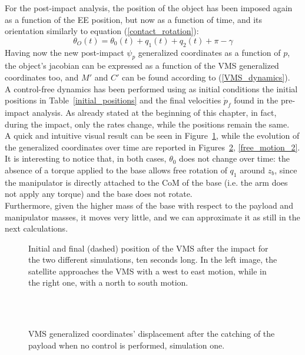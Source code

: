 \documentclass[a4paper,12pt,oneside]{report}
\begin{document}
For the post-impact analysis, the position of the object has been imposed again as a function of the EE position, but now as a function of time, and its orientation similarly to equation (\ref{contact_rotation}):
\begin{equation}
  \theta_O(t)=\theta_0(t)+q_1(t)+q_2(t)+\pi-\gamma
\end{equation}
Having now the new post-impact $\psi_p$ generalized coordinates as a function of $p$, the object's jacobian can be expressed as a function of the VMS generalized coordinates too, and $M'$ and $C'$ can be found according to (\ref{VMS_dynamics}).\\
A control-free dynamics has been performed using as initial conditions the initial positions in Table~\ref{initial_positions} and the final velocities $\dot{p}_f$ found in the pre-impact analysis. As already stated at the beginning of this chapter, in fact, during the impact, only the rates change, while the positions remain the same.\\
A quick and intuitive visual result can be seen in Figure~\ref{no_control_result}, while the evolution of the generalized coordinates over time are reported in Figures~\ref{free_motion_1}, \ref{free_motion_2}.\\
It is interesting to notice that, in both cases, $\theta_0$ does not change over time: the absence of a torque applied to the base allows free rotation of $q_1$ around $z_b$, since the manipulator is directly attached to the CoM of the base (i.e. the arm does not apply any torque) and the base does not rotate.\\
Furthermore, given the higher mass of the base with respect to the payload and manipulator masses, it moves very little, and we can approximate it as still in the next calculations.\\
\begin{figure}[!htb]
  \centering
  \caption{Initial and final (dashed) position of the VMS after the impact for the two different simulations, ten seconds long. In the left image, the satellite approaches the VMS with a west to east motion, while in the right one, with a north to south motion.}
  \label{no_control_result}
\end{figure}
\begin{figure}[!htb]
  \centering
  \subfloat
  {} \quad
\subfloat
  {} \\
  \subfloat
  {} \quad
  \subfloat
  {}\\
  \subfloat
  {}
  \caption{VMS generalized coordinates' displacement after the catching of the payload when no control is performed, simulation one.}
  \label{free_motion_1}
\end{figure}
\end{document}
